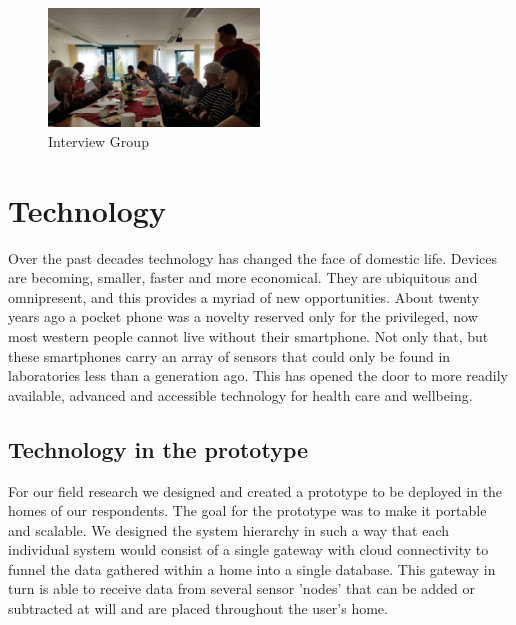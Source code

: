 \documentclass{below-ext}
\begin{document}
\begin{figure}
\centering
\includegraphics[width=0.5\textwidth]{interview}
\caption{Interview Group}
\label{fig:interview}
\end{figure}

\section{Technology}
Over the past decades technology has changed the face of domestic life. Devices are becoming, smaller, faster and more economical. They are ubiquitous and omnipresent, and this provides a myriad of new opportunities. About twenty years ago a pocket phone was a novelty reserved only for the privileged, now most western people cannot live without their smartphone. Not only that, but these smartphones carry an array of sensors that could only be found in laboratories less than a generation ago. This has opened the door to more readily available, advanced and accessible technology for health care and wellbeing.

\subsection{Technology in the prototype}

For our field research we designed and created a prototype to be deployed in the homes of our respondents. The goal for the prototype was to make it portable and scalable. We designed the system hierarchy in such a way that each individual system would consist of a single gateway with cloud connectivity to funnel the data gathered within a home into a single database. This gateway  in turn is able to receive data from several sensor 'nodes' that can be added or subtracted at will and are placed throughout the user's home. 
 
\end{document}
